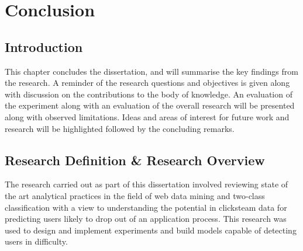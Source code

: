 \chapter{Conclusion} %

\label{Chapter6} %



\section{Introduction}
This chapter concludes the dissertation, and will summarise the key findings from the research. A reminder of the research questions and objectives is given along with discussion on the contributions to the body of knowledge.
An evaluation of the experiment along with an evaluation of the overall research will be presented along with observed limitations. Ideas and areas of interest for future work and research will be highlighted followed by the concluding remarks.




\section{Research Definition \& Research Overview}
The research carried out as part of this dissertation involved reviewing state of the art analytical practices in the field of web data mining and two-class classification with a view to understanding the potential in clicksteam data for predicting users likely to drop out of an application process. This research was used to design and implement experiments and build models capable of detecting users in difficulty. 


